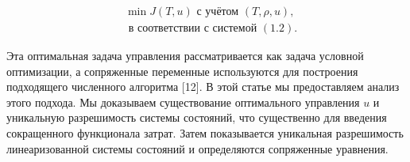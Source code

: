 \[
    \begin{aligned}
        & \min J(T, u) \text { с учётом }(T, \rho, u), \\
        & \text { в соответствии с системой }(1.2).
    \end{aligned}
\]


Эта оптимальная задача управления рассматривается как задача условной оптимизации,
а сопряженные переменные используются для построения подходящего численного алгоритма [12].
В этой статье мы предоставляем анализ этого подхода.
Мы доказываем существование оптимального управления $u$ и уникальную разрешимость системы состояний,
что существенно для введения сокращенного функционала затрат.
Затем показывается уникальная разрешимость линеаризованной системы состояний
и определяются сопряженные уравнения.
